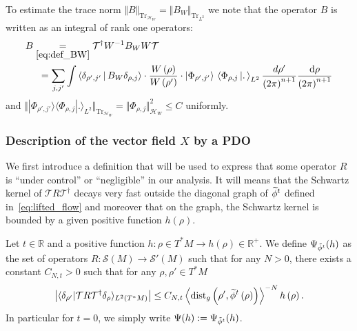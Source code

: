 \documentclass[AHL,Unicode,longabstracts,published]{cedram}
\newcommand{\clS}{\mathcal{S}}
\newcommand{\clT}{\mathcal{T}}
\newcommand{\clH}{\mathcal{H}}
\newcommand{\dist}{\mathrm{dist}}
\newcommand{\Tr}{\mathrm{Tr}}
\newcommand{\bbR}{\mathbb{R}}
\let\oldtilde\tilde
\renewcommand*{\tilde}[1]{\mathchoice{\widetilde{#1}}{\widetilde{#1}}{\oldtilde{#1}}{\oldtilde{#1}}}
\newcommand{\clH}{\mathcal{H}}
\newcommand{\bbR}{\mathbb{R}}
\begin{document}
\begin{rema}\label{rem:To-estimate-the}
To estimate the trace norm $\Vert B\Vert _{\Tr_{\clH _{W}}}=\Vert B_{W}\Vert _{\Tr_{L^{2}}}$ we note that the operator $B$ is written as an integral of rank one operators:
\begin{equation}\label{eq:expression_integral_of_rankone}
\begin{split}
B &\underset{\eqref{eq:def_BW}}{=}  \clT^{\dagger}W^{-1}B_{W}W\clT
\\
& \mkern10mu= \sum_{j,j'}\int\left\langle\delta_{\rho',j'}\,\middle|\,B_{W}\delta_{\rho,j}\right\rangle\cdot\frac{W\left(\rho\right)}{W\left(\rho'\right)}\cdot\left|\Phi_{\rho',j'}\right\rangle\,\left\langle\Phi_{\rho,j}\,\middle|.\,\right\rangle_{L^{2}}\frac{d\rho'}{\left(2\pi\right)^{n+1}}\frac{\text{d\ensuremath{\rho}}}{\left(2\pi\right)^{n+1}}
\end{split}
\end{equation}
and $\Vert |\Phi_{\rho',j'}\rangle\langle\Phi_{\rho,j}|.\rangle_{L^{2}}\Vert _{\Tr_{\clH _{W}}}=\Vert \Phi_{\rho,j}\Vert _{\clH _{W}}^{2}\leq C$ uniformly.
\end{rema}


\subsubsection{Description of the vector field \texorpdfstring{$X$}{X} by a PDO}\label{subsec:Description-of-the}

We first introduce a definition that will be used to express that some operator $R$ is ``under control'' or ``negligible'' in our analysis. It will means that the Schwartz kernel of $\clT R\clT^{\dagger}$ decays very fast outside the diagonal graph of $\tilde{\phi}^{t}$ defined in~\eqref{eq:lifted_flow} and moreover that on the graph, the Schwartz kernel is bounded by a given positive function $h(\rho)$.

\begin{cBoxA}{}
\begin{defi}\label{def:Let--be-1}
Let $t\in\bbR$ and a positive function $h:\rho\in T^{*}M\rightarrow h(\rho)\in\bbR^{+}$. We define $\Psi_{\tilde{\phi}^{t}}(h)$ as the set of operators $R:\clS(M)\rightarrow\clS'(M)$ such that for any $N>0$, there exists a constant $C_{N,t}>0$ such that for any $\rho,\rho'\in T^{*}M$
\begin{equation}\label{eq:microl_estimate-2}
\left|\langle\delta_{\rho'}|\clT R\clT^{\dagger}\delta_{\rho}\rangle_{L^{2}\left(T^{*}M\right)}\right| \leq C_{N,t}\left\langle \dist_{g}\left(\rho',\tilde{\phi}^{t}\left(\rho\right)\right)\right\rangle ^{-N}h\left(\rho\right).
\end{equation}
In particular for $t=0$, we simply write $\Psi(h):=\Psi_{\tilde{\phi}^{t}}(h)$.
\end{defi}
\end{cBoxA}
\end{document}
